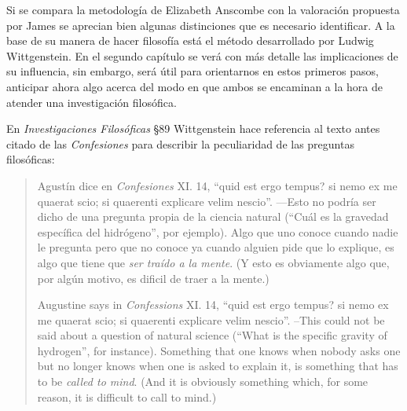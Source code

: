 Si se compara la metodología de Elizabeth Anscombe con la valoración propuesta
por James se aprecian bien algunas distinciones que es necesario identificar. A
la base de su manera de hacer filosofía está el método desarrollado por Ludwig
Wittgenstein. En el segundo capítulo se verá con más detalle las implicaciones
de su influencia, sin embargo, será útil para orientarnos en estos primeros
pasos, anticipar ahora algo acerca del modo en que ambos se encaminan a la hora
de atender una investigación filosófica.

En \emph{Investigaciones Filosóficas} \S89 Wittgenstein hace referencia al texto
antes citado de las \emph{Confesiones} para describir la peculiaridad de las
preguntas filosóficas:

\blockquote[Augustine says in \emph{Confessions} XI. 14, \enquote{quid est ergo
  tempus? si nemo ex me quaerat scio; si quaerenti explicare velim nescio}.
--This could not be said about a question of natural science (\enquote{What is
  the specific gravity of hydrogen}, for instance). Something that one knows
when nobody asks one but no longer knows when one is asked to explain it, is
something that has to be \emph{called to mind}. (And it is obviously something
which, for some reason, it is difficult to call to mind.)
{\cite[\S89]{wittgenstein1953phiinv}}]{Agustín dice en \emph{Confesiones} XI.
  14, \enquote{quid est ergo tempus? si nemo ex me quaerat scio; si quaerenti
    explicare velim nescio}. ---Esto no podría ser dicho de una pregunta propia
  de la ciencia natural (\enquote{Cuál es la gravedad específica del hidrógeno},
  por ejemplo). Algo que uno conoce cuando nadie le pregunta pero que no conoce
  ya cuando alguien pide que lo explique, es algo que tiene que \emph{ser traído
    a la mente}. (Y esto es obviamente algo que, por algún motivo, es dificil de
  traer a la mente.)}

